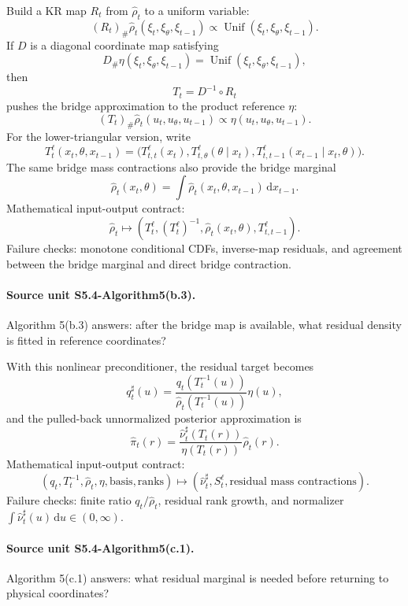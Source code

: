 \documentclass[11pt]{article}
\newcommand{\dd}{\,\mathrm d}
\begin{document}
Build a KR map \(R_t\) from \(\widehat\rho_t\) to a uniform variable:
\[
    (R_t)_\#\widehat\rho_t(\xi_t,\xi_\theta,\xi_{t-1})
    \propto
    \operatorname{Unif}(\xi_t,\xi_\theta,\xi_{t-1}).
    \tag{P8}
\]
If \(D\) is a diagonal coordinate map satisfying
\[
    D_\#\eta(\xi_t,\xi_\theta,\xi_{t-1})
    =
    \operatorname{Unif}(\xi_t,\xi_\theta,\xi_{t-1}),
    \tag{P9}
\]
then
\[
    T_t=D^{-1}\circ R_t
    \tag{P10}
\]
pushes the bridge approximation to the product reference \(\eta\):
\[
    (T_t)_\#\widehat\rho_t(u_t,u_\theta,u_{t-1})
    \propto
    \eta(u_t,u_\theta,u_{t-1}).
    \tag{P11}
\]
For the lower-triangular version, write
\[
    T_t^{\ell}(x_t,\theta,x_{t-1})
    =
    \bigl(
    T_{t,t}^{\ell}(x_t),
    T_{t,\theta}^{\ell}(\theta\mid x_t),
    T_{t,t-1}^{\ell}(x_{t-1}\mid x_t,\theta)
    \bigr).
    \tag{P11a}
\]
The same bridge mass contractions also provide the bridge marginal
\[
    \widehat\rho_t(x_t,\theta)
    =
    \int\widehat\rho_t(x_t,\theta,x_{t-1})\dd x_{t-1}.
    \tag{P11b}
\]
Mathematical input-output contract:
\[
    \widehat\rho_t
    \mapsto
    (T_t^\ell,(T_t^\ell)^{-1},\widehat\rho_t(x_t,\theta),
    T_{t,t-1}^\ell).
    \tag{P11c}
\]
Failure checks: monotone conditional CDFs, inverse-map residuals, and agreement
between the bridge marginal and direct bridge contraction.

\paragraph{Source unit S5.4-Algorithm5(b.3).}
Algorithm 5(b.3) answers: after the bridge map is available, what residual
density is fitted in reference coordinates?

With this nonlinear preconditioner, the residual target becomes
\[
    q^\sharp_t(u)
    =
    \frac{q_t(T_t^{-1}(u))}
    {\widehat\rho_t(T_t^{-1}(u))}
    \eta(u),
    \tag{P12}
\]
and the pulled-back unnormalized posterior approximation is
\[
    \widehat\pi_t(r)
    =
    \frac{\widehat\nu^\sharp_t(T_t(r))}
    {\eta(T_t(r))}
    \widehat\rho_t(r).
    \tag{P13}
\]
Mathematical input-output contract:
\[
    (q_t,T_t^{-1},\widehat\rho_t,\eta,\text{basis},\text{ranks})
    \mapsto
    (\widehat\nu_t^\sharp,S_t^\ell,\text{residual mass contractions}).
    \tag{P13a}
\]
Failure checks: finite ratio \(q_t/\widehat\rho_t\), residual rank growth, and
normalizer \(\int\widehat\nu_t^\sharp(u)\dd u\in(0,\infty)\).

\paragraph{Source unit S5.4-Algorithm5(c.1).}
Algorithm 5(c.1) answers: what residual marginal is needed before returning to
physical coordinates?
\end{document}
